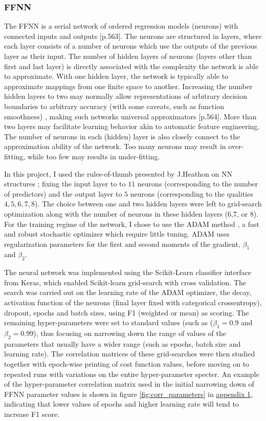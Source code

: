 \documentclass[%
oneside,                 %
final,                   %
10pt]{article}
\begin{document}
\subsubsection{FFNN} \label{FFNN}
The FFNN is a serial network of ordered regression models (neurons) with connected inputs and outputs \citep{MLMurphy}[p.563]. The neurons are structured in layers, where each layer consists of a number of neurons which use the outputs of the previous layer as their input. The number of  hidden layers of neurons (layers other than first and last layer) is directly associated with the complexity the network is able to approximate. With one hidden layer, the network is typically able to approximate mappings from one finite space to another. Increasing the number hidden layers to two may normally allow representations of arbitrary decision boundaries to arbitrary accuracy (with some caveats, such as function smoothness) \cite{layers}, making such networks universal approximators \citep{MLMurphy}[p.564]. More than two layers may facilitate learning behavior akin to automatic feature engineering. The number of neurons in each (hidden) layer is also closely connect to the approximation ability of the network. Too many neurons may result in over-fitting, while too few may results in under-fitting.

 In this project, I used the rules-of-thumb presented by J.Heathon on NN structures  \cite{layers}; fixing the input layer to to $11$ neurons (corresponding to the number of predictors) and the output layer to $5$ neurons (corresponding to the qualities $4,5,6,7,8$). The choice between one and two hidden layers were left to grid-search optimization along with the number of neurons in these hidden layers (6,7, or 8). For the training regime of the network, I chose to use the ADAM method \citep{adam}, a fast and robust stochastic optimizer which require little tuning. ADAM uses regularization parameters for the first and second moments of the gradient, $\beta_1$ and $\beta_2$. 
 
The neural network was implemented using the Scikit-Learn classifier interface from Keras, which enabled Scikit-learn grid-search with cross validation. The search was carried out on the learning rate of the ADAM optimizer, the decay, activation function of the neurons (final layer fixed with categorical crossentropy), dropout, epochs and batch sizes, using   F1 (weighted or mean) as scoring. The remaining hyper-parameters were set to standard values (such as ($\beta_1=0.9$ and $\beta_2=0.99$), thus focusing on narrowing down the range of values of the parameters that usually have a wider range (such as epochs, batch size and learning rate). The correlation matrices of these grid-searches were then studied together with epoch-wise printing of cost function values, before moving on to repeated runs with variations on the entire hyper-parameter specter. An example of the hyper-parameter correlation matrix used in the initial narrowing down of FFNN  parameter values is shown in figure \ref{fig:corr_parameters} in  \hyperref[APP_1]{appendix 1}, indicating that lower values of epochs and higher learning rate will tend to increase F1 score.
\end{document}
